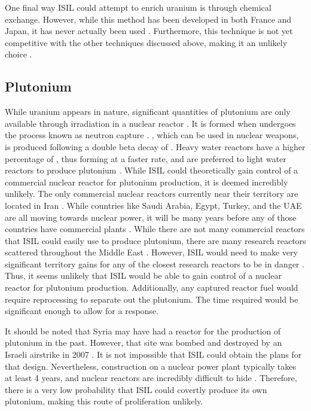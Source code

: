 \documentclass{report}
\begin{document}
One final way ISIL could attempt to enrich uranium is through chemical exchange. However, while this method has been developed in both France and Japan, it has never actually been used \cite{Africa2012}. Furthermore, this technique is not yet competitive with the other techniques discussed above, making it an unlikely choice \cite{Moody2014}. 

\subsection{Plutonium} 

While uranium appears in nature, significant quantities of plutonium are only available through irradiation in a nuclear reactor \cite{Benedict1981}. It is formed when  undergoes the process known as neutron capture \cite{Benedict1981}. , which can be used in nuclear weapons, is produced following a double beta decay of  \cite{Duderstadt1976}. Heavy water reactors have a higher percentage of , thus forming  at a faster rate, and are preferred to light water reactors to produce plutonium \cite{Moody2014}. While ISIL could theoretically gain control of a commercial nuclear reactor for plutonium production, it is deemed incredibly unlikely. The only commercial nuclear reactors currently near their territory are located in Iran \cite{WorldNuclearAssociation2015}. While countries like Saudi Arabia, Egypt, Turkey, and the UAE are all moving towards nuclear power, it will be many years before any of those countries have commercial plants \cite{WorldNuclearAssociation2015}. While there are not many commercial reactors that ISIL could easily use to produce plutonium, there are many research reactors scattered throughout the Middle East \cite{WorldNuclearAssociation2015a}. However, ISIL would need to make very significant territory gains for any of the closest research reactors to be in danger \cite{BBC2015}. Thus, it seems unlikely that ISIL would be able to gain control of a nuclear reactor for plutonium production. Additionally, any captured reactor fuel would require reprocessing to separate out the plutonium. The time required would be significant enough to allow for a response.  

It should be noted that Syria may have had a reactor for the production of plutonium in the past. However, that site was bombed and destroyed by an Israeli airstrike in 2007 \cite{WorldNuclearAssociation2015a}. It is not impossible that ISIL could obtain the plans for that design. Nevertheless, construction on a nuclear power plant typically takes at least 4 years, and nuclear reactors are incredibly difficult to hide \cite{WorldNuclearAssociation2015a,NuclearEnergyInstitute2015}. Therefore, there is a very low probability that ISIL could covertly produce its own plutonium, making this route of proliferation unlikely.  
\end{document}
